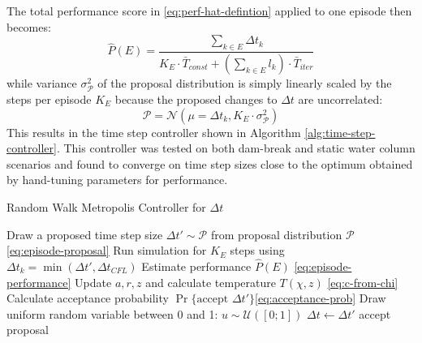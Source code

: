 \documentclass[oneside, a4paper]{book}
\newcommand\br[1]{\left(#1\right)}
\begin{document}
    The total performance score in \autoref{eq:perf-hat-defintion} applied to one episode then becomes:
    \begin{equation}\label{eq:episode-performance}
      \hat{P}\br{E} = \frac{
        \sum_{k\in E} \Delta t_k
      }{
        K_{E}\cdot \bar{T}_{const} + \br{\sum_{k\in E} l_k} \cdot \bar{T}_{iter}
      }
    \end{equation}
    while variance $\sigma^2_\mathcal{P}$ of the proposal distribution is simply linearly scaled by the steps per episode $K_E$ because the proposed changes to $\Delta t$ are uncorrelated:
    \begin{equation}\label{eq:episode-proposal}
      \mathcal{P} = \mathcal{N}\br{\mu = \Delta t_k, K_{E}\cdot\sigma^2_\mathcal{P}}
    \end{equation}
    This results in the time step controller shown in Algorithm \ref{alg:time-step-controller}. This controller was tested on both dam-break and static water column scenarios and found to converge on time step sizes close to the optimum obtained by hand-tuning parameters for performance.

    
    \begin{algorithm}
      \caption{Random Walk Metropolis Controller for $\Delta t$}
      \label{alg:time-step-controller}
      \begin{algorithmic}[1]
          \State Draw a proposed time step size $\Delta t' \sim \mathcal{P}$ from proposal distribution $\mathcal{P}$ \Comment\autoref{eq:episode-proposal}
          \State Run simulation for $K_E$ steps using $\Delta t_k=\min\br{\Delta t', \Delta t_{CFL}}$
          \State Estimate performance $\hat{P}\br{E}$ \Comment\autoref{eq:episode-performance}
          \State Update $a,r,z$ and calculate temperature $T\br{\chi,z}$ \Comment\autoref{eq:c-from-chi}
          \State Calculate acceptance probability $\Pr\{\text{accept }\Delta t'\}$\Comment\autoref{eq:acceptance-prob}
          \State Draw uniform random variable between 0 and 1: $u\sim\mathcal{U}\br{[0;1]}$
            \State $\Delta t \gets \Delta t'$ \Comment accept proposal
          \EndIf 
        \EndFor
      
      \end{algorithmic}
    \end{algorithm}

    

    
\end{document}

